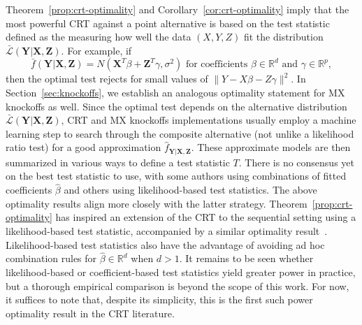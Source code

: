 \documentclass[12pt]{article}
\theoremstyle{definition}
\theoremstyle{remark}
\newcommand{\prx}{\bm X}
\newcommand{\srx}{X}
\newcommand{\prz}{\bm Z}
\newcommand{\srz}{Z}
\newcommand{\pry}{{\bm Y}}
\newcommand{\sry}{Y}
\begin{document}
Theorem~\ref{prop:crt-optimality} and Corollary~\ref{cor:crt-optimality} imply that the most powerful CRT against a point alternative is based on the test statistic defined as the measuring how well the data $(\srx, \sry, \srz)$ fit the distribution $\bar{\mathcal L}(\pry|\prx,\prz)$. For example, if
\begin{equation}
\bar f(\pry|\prx,\prz) = N(\prx^T\beta + \prz^T \gamma, \sigma^2) \text{ for coefficients } \beta \in \mathbb R^d \text{ and } \gamma \in \mathbb R^p,
\label{linear-model}
\end{equation}
then the optimal test rejects for small values of $\|\sry - \srx \beta - \srz \gamma \|^2$. In Section~\ref{sec:knockoffs}, we establish an analogous optimality statement for MX knockoffs as well. Since the optimal test depends on the alternative distribution $\bar{\mathcal L}(\pry|\prx,\prz)$, CRT and MX knockoffs implementations usually employ a machine learning step to search through the composite alternative (not unlike a likelihood ratio test) for a good approximation $\widehat f_{\pry|\prx,\prz}$. These approximate models are then summarized in various ways to define a test statistic $T$. There is no consensus yet on the best test statistic to use, with some authors \cite{CetL16, SetC17, SetS19} using combinations of fitted coefficients $\widehat \beta$ and others  \cite{Tansey2018, Bates2020} using likelihood-based test statistics. The above optimality results align more closely with the latter strategy. Theorem~\ref{prop:crt-optimality} has inspired an extension of the CRT to the sequential setting using a likelihood-based test statistic, accompanied by a similar optimality result~\cite{Grunwald2022}. Likelihood-based test statistics also have the advantage of avoiding ad hoc combination rules for $\widehat \beta \in \mathbb R^d$ when $d > 1$. It remains to be seen whether likelihood-based or coefficient-based test statistics yield greater power in practice, but a thorough empirical comparison is beyond the scope of this work. For now, it suffices to note that, despite its simplicity, this is the first such power optimality result in the CRT literature.

\end{document}
